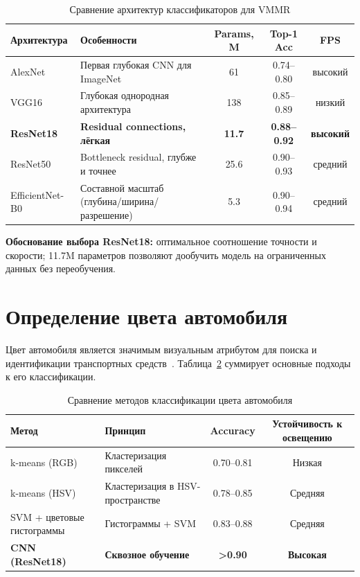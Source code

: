 \documentclass[10pt,a4paper]{report}
\numberwithin{equation}{chapter}
\numberwithin{figure}{chapter}
\numberwithin{table}{chapter}
\begin{document}
\begin{table}[H]
\centering
\caption{Сравнение архитектур классификаторов для VMMR}
\label{tab:vmmr_compare}
\begin{tabularx}{\textwidth}{l>{\raggedright\arraybackslash}Xccc}
\toprule
\textbf{Архитектура} & \textbf{Особенности} & \textbf{Params, M} & \textbf{Top-1 Acc} & \textbf{FPS} \\
\midrule
AlexNet        & Первая глубокая CNN для ImageNet     & 61   & 0.74--0.80 & высокий \\
VGG16          & Глубокая однородная архитектура      & 138  & 0.85--0.89 & низкий  \\
\textbf{ResNet18} & \textbf{Residual connections, лёгкая} & \textbf{11.7} & \textbf{0.88--0.92} & \textbf{высокий} \\
ResNet50       & Bottleneck residual, глубже и точнее & 25.6 & 0.90--0.93 & средний \\
EfficientNet-B0 & Составной масштаб (глубина/ширина/разрешение) & 5.3 & 0.90--0.94 & средний \\
\bottomrule
\end{tabularx}
\end{table}

\noindent\textbf{Обоснование выбора ResNet18:} оптимальное соотношение
точности и скорости; 11.7M параметров позволяют дообучить модель
на ограниченных данных без переобучения.

\section{Определение цвета автомобиля}

Цвет автомобиля является значимым визуальным атрибутом для поиска
и идентификации транспортных средств~\cite{su2015}.
Таблица~\ref{tab:color_methods} суммирует основные подходы к его классификации.

\begin{table}[H]
\centering
\caption{Сравнение методов классификации цвета автомобиля}
\label{tab:color_methods}
\begin{tabularx}{\textwidth}{lXcc}
\toprule
\textbf{Метод} & \textbf{Принцип} & \textbf{Accuracy} & \textbf{Устойчивость к освещению} \\
\midrule
k-means (RGB)       & Кластеризация пикселей         & 0.70--0.81 & Низкая \\
k-means (HSV)       & Кластеризация в HSV-пространстве & 0.78--0.85 & Средняя \\
SVM + цветовые гистограммы & Гистограммы + SVM        & 0.83--0.88 & Средняя \\
\textbf{CNN (ResNet18)} & \textbf{Сквозное обучение}  & \textbf{>0.90} & \textbf{Высокая} \\
\bottomrule
\end{tabularx}
\end{table}
\end{document}

